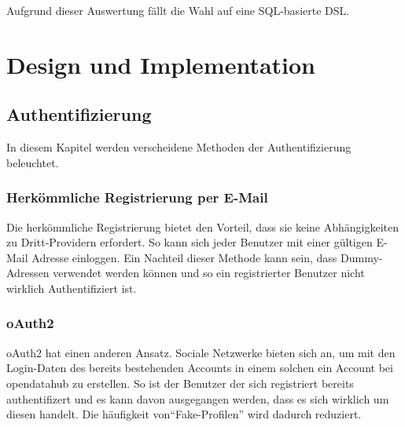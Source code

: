 Aufgrund dieser Auswertung fällt die Wahl auf eine SQL-basierte DSL.

\chapter{Design und Implementation}

\section{Authentifizierung}
\xxx[@rliebi: kapitel design = IST zustand. hier hat es vergleiche]
In diesem Kapitel werden verscheidene Methoden der Authentifizierung beleuchtet.
\subsection{Herkömmliche Registrierung per E-Mail}
Die herkömmliche Registrierung bietet den Vorteil, dass sie keine Abhängigkeiten zu Dritt-Providern erfordert. So kann sich jeder Benutzer mit einer gültigen E-Mail Adresse einloggen. Ein Nachteil dieser Methode kann sein, dass Dummy-Adressen verwendet werden können und so ein registrierter Benutzer nicht wirklich Authentifiziert ist.
\subsection{oAuth2}
oAuth2 hat einen anderen Ansatz. Sociale Netzwerke bieten sich an, um mit den Login-Daten des bereits bestehenden Accounts in einem solchen ein Account bei opendatahub zu erstellen. So ist der Benutzer der sich registriert bereits authentifizert und es kann davon ausgegangen werden, dass es sich wirklich um diesen handelt. Die häufigkeit von``Fake-Profilen'' wird dadurch reduziert.

